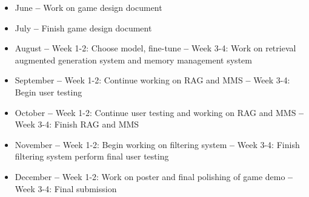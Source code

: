 \documentclass[10pt,twocolumn]{article}
\begin{document}
    \begin{itemize}
        \item June \newline\newline
            \textbf{--} Work on game design document \newline
        \item July \newline\newline
            \textbf{--} Finish game design document \newline
        \item August \newline\newline
            \textbf{--} Week 1-2: Choose model, fine-tune \newline
            \textbf{--} Week 3-4: Work on retrieval augmented generation system and memory management system \newline
        \item September \newline\newline
            \textbf{--} Week 1-2: Continue working on RAG and MMS \newline
            \textbf{--} Week 3-4: Begin user testing \newline
        \item October\newline\newline
            \textbf{--} Week 1-2: Continue user testing and working on RAG and MMS \newline
            \textbf{--} Week 3-4: Finish RAG and MMS \newline
        \item November \newline\newline
            \textbf{--} Week 1-2: Begin working on filtering system \newline
            \textbf{--} Week 3-4: Finish filtering system perform final user testing \newline
        \item December\newline\newline
            \textbf{--} Week 1-2: Work on poster and final polishing of game demo \newline
            \textbf{--} Week 3-4: Final submission \newline
    \end{itemize}
    
\printbibliography
\end{document}

